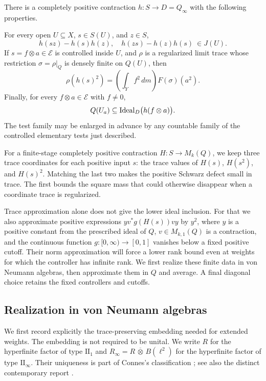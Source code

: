 \begin{theorem}\label{tc:rough-model}
There is a completely positive contraction $h:S\to D=Q_\infty$ with the
following properties.

For every open $U\subseteq X$, $s\in S(U)$, and $z\in S$,
\begin{equation}\label{tc:mixed}
 h(sz)-h(s)h(z),\quad h(zs)-h(z)h(s)\ \in J(U).
\end{equation}
If $s=f\otimes a\in\mathcal E$ is controlled inside $U$, and $\rho$ is a
regularized limit trace whose restriction $\sigma=\rho|_Q$ is densely
finite on $Q(U)$, then
\begin{equation}\label{tc:square}
 \rho(h(s)^2)=\left(\int_Y f^2\,dm\right)F(\sigma)(a^2).
\end{equation}
Finally, for every $f\otimes a\in\mathcal E$ with $f\ne0$,
\begin{equation}\label{tc:lower-ideal}
 Q(U_a)\subseteq\operatorname{Ideal}_D\bigl(h(f\otimes a)\bigr).
\end{equation}
The test family may be enlarged in advance by any countable family of
the controlled elementary tests just described.
\end{theorem}

For a finite-stage completely positive contraction $H:S\to M_k(Q)$,
we keep three trace coordinates for each positive input $s$: the trace
values of $H(s)$, $H(s^2)$, and $H(s)^2$.  Matching the last
two makes the positive Schwarz defect small in trace.  The first bounds
the square mass that could otherwise disappear when a coordinate trace
is regularized.

Trace approximation alone does not give the lower ideal inclusion.  For
that we also approximate positive expressions
$yv^*g(H(s))vy$ by $y^2$, where $y$ is a positive constant from the prescribed
ideal of $Q$, $v\in M_{k,1}(Q)$ is a contraction, and the continuous function
$g:[0,\infty)\to[0,1]$ vanishes below a fixed positive cutoff.  Their norm approximation will force a lower rank bound even at
weights for which the controller has infinite rank.  We first realize
these finite data in von Neumann algebras, then approximate them in $Q$
and average.  A final diagonal choice retains the fixed controllers and
cutoffs.

\subsection{Realization in von Neumann algebras}

We first record explicitly the trace-preserving embedding needed for
extended weights. The embedding is not required to be unital.
We write $R$ for the hyperfinite factor of type $\mathrm{II}_1$ and
$R_\infty=R\,\overline\otimes\,B(\ell^2)$ for the hyperfinite factor
of type $\mathrm{II}_\infty$. Their uniqueness is part of Connes's
classification \cite{Connes}; see also the distinct contemporary
report \cite[Theorems~4.2.1 and~4.3.1]{ConnesReport}.


